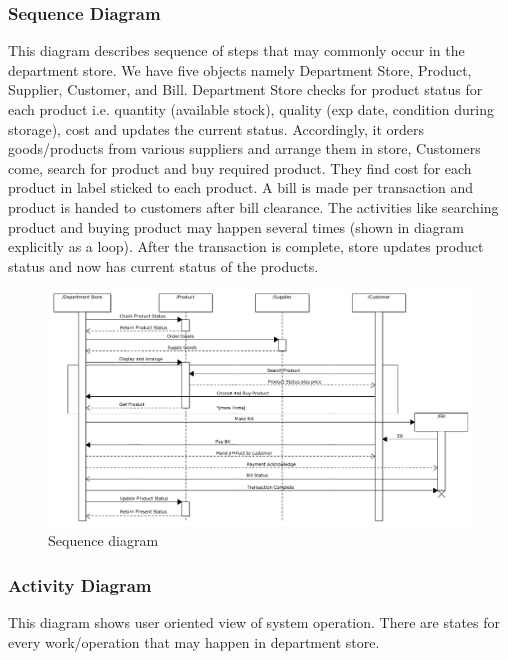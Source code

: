 \subsubsection{Sequence Diagram}

This diagram describes sequence of steps that may commonly occur in the
department store. We have five objects namely Department Store, Product,
Supplier, Customer, and Bill. Department Store checks for product status for
each product i.e. quantity (available stock), quality (exp date, condition
during storage), cost and updates the current status. Accordingly, it orders
goods/products from various suppliers and arrange them in store, Customers
come, search for product and buy required product. They find cost for each
product in label sticked to each product. A bill is made per transaction and
product is handed to customers after bill clearance. The activities like
searching product and buying product may happen several times (shown in diagram
explicitly as a loop). After the transaction is complete, store updates product
status and now has current status of the products.

\begin{figure}[h!]\centering
  \includegraphics[width=\textwidth]{fig/sequence}
  \caption{Sequence diagram}\label{fig:sequence}
\end{figure}


\subsubsection{Activity Diagram}

This diagram shows user oriented view of system operation. There are states for
every work/operation that may happen in department store.

